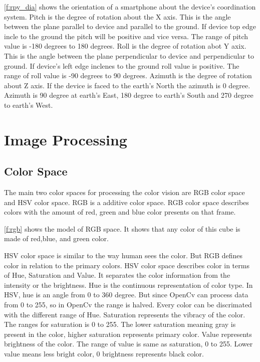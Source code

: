 \ref{f:rpy_dia} shows the orientation of a smartphone about the device's coordination system.
Pitch is the degree of rotation about the X axis.
This is the angle between the plane parallel to device and parallel to the ground.
If device top edge incle to the ground the pitch will be positive and vice versa.
The range of pitch value is -180 degrees to 180 degrees.
Roll is the degree of rotation abot Y axix.
This is the angle between the plane perpendicular to device and perpendicular to ground.
If device's left edge inclenes to the ground roll value is positive.
The range of roll value is -90 degrees to 90 degrees.
Azimuth is the degree of rotation about Z axis.
If the device is faced to the earth's North the azimuth is 0 degree.
Azimuth is 90 degree at earth's East, 180 degree to earth's South and 270 degree to earth's West.

\section {Image Processing}

\subsection{Color Space}
The main two color spaces for processing the color vision are RGB color space and HSV color space.
RGB is a additive color space.
RGB color space describes colors with the amount of red, green and blue color presents on that frame.


\ref{f:rgb} shows the model of RGB space.
It shows that any color of this cube is made of red,blue, and green color.

HSV color space is similar to the way human sees the color.
But RGB defines color in relation to the primary colors.
HSV color space describes color in terms of Hue, Saturation and Value.
It separates the color information from the intensity or the brightness.
Hue is the continuous representation of color type.
In HSV, hue is an angle from 0 to 360 degree. 
But since OpenCv can process data from 0 to 255, so in OpenCv the range is halved.
Every color can be discrimated with the different range of Hue.
Saturation represents the vibracy of the color.
The ranges for saturation is 0 to 255.
The lower saturation meaning gray is present in the color, higher saturation represents primary color.
Value represents brightness of the color.
The range of value is same as saturation, 0 to 255.
Lower value means less bright color, 0 brightness represents black color.

